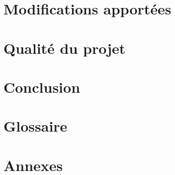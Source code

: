 \documentclass[12pt,oneside]{report}
\begin{document}
\newpage
\section{Modifications apportées}
    
    \newpage
    
\section{Qualité du projet}
    
    \newpage
    
\section{Conclusion}
    
    \newpage
    
\section{Glossaire}
    
    \newpage
    
\section{Annexes}
    
    \newpage
    
\end{document}
